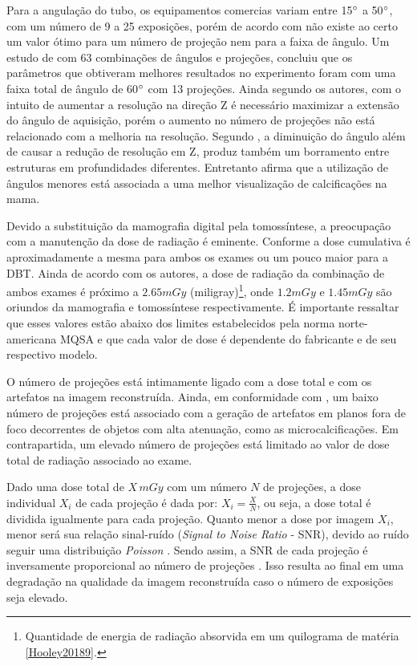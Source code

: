 Para a angulação do tubo, os equipamentos comercias variam entre 15$\degree$ a 50$\degree$, com um número de 9 a 25 exposições, porém de acordo com  não existe ao certo um valor ótimo para um número de projeção nem para a faixa de ângulo. Um estudo de  com 63 combinações de ângulos e projeções, concluiu que os parâmetros que obtiveram melhores resultados no experimento foram com uma faixa total de ângulo de 60$\degree$ com 13 projeções. Ainda segundo os autores, com o intuito de aumentar a resolução na direção Z é necessário maximizar a extensão do ângulo de aquisição, porém o aumento no número de projeções não está relacionado com a melhoria na resolução. Segundo , a diminuição do ângulo além de causar a redução de resolução em Z, produz também um borramento entre estruturas em profundidades diferentes. Entretanto  afirma que a utilização de ângulos menores está associada a uma melhor visualização de calcificações na mama. 

Devido a substituição da mamografia digital pela tomossíntese, a preocupação com a manutenção da dose de radiação é eminente. Conforme  a dose cumulativa é aproximadamente a mesma para ambos os exames ou um pouco maior para a \acs{DBT}. Ainda de acordo com os autores, a dose de radiação da combinação de ambos exames é próximo a $2.65 mGy$ (miligray)\footnote{Quantidade de energia de radiação absorvida em um quilograma de matéria \ref{Hooley20189}.}, onde $1.2 mGy$ e $1.45 mGy$ são oriundos da mamografia e tomossíntese respectivamente. É importante ressaltar que esses valores estão abaixo dos limites estabelecidos pela norma norte-americana \ac{MQSA} e que cada valor de dose é dependente do fabricante e de seu respectivo modelo. 

O número de projeções está intimamente ligado com a dose total e com os artefatos na imagem reconstruída. Ainda, em conformidade com , um baixo número de projeções está associado com a geração de artefatos em planos fora de foco decorrentes de objetos com alta atenuação, como as microcalcificações. Em contrapartida, um elevado número de projeções está limitado ao valor de dose total de radiação associado ao exame. 

Dado uma dose total de $X\,mGy$ com um número $N$ de projeções, a dose individual $X_{i}$ de cada projeção é dada por: $X_{i} = \frac{X}{N}$, ou seja, a dose total é dividida igualmente para cada projeção. Quanto menor a dose por imagem $X_{i}$, menor será sua relação sinal-ruído (\textit{Signal to Noise Ratio} - \acs{SNR}), devido ao ruído seguir uma distribuição \textit{Poisson} \cite{borges2017pipeline}. Sendo assim, a \acs{SNR} de cada projeção é inversamente proporcional ao número de projeções \cite{sechopoulos2009optimization}. Isso resulta ao final em uma degradação na qualidade da imagem reconstruída caso o número de exposições seja elevado.  

